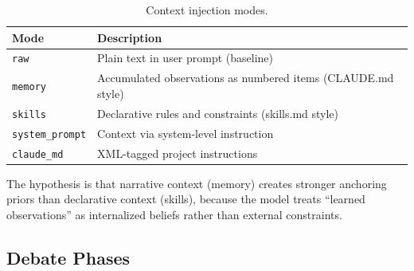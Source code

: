 \documentclass[11pt]{article}
\begin{document}
\begin{table}[t]
\centering
\caption{Context injection modes.}
\label{tab:injection-modes}
\small
\begin{tabular}{@{}lp{8cm}@{}}
\toprule
\textbf{Mode} & \textbf{Description} \\
\midrule
\texttt{raw} & Plain text in user prompt (baseline) \\
\texttt{memory} & Accumulated observations as numbered items (CLAUDE.md style) \\
\texttt{skills} & Declarative rules and constraints (skills.md style) \\
\texttt{system\_prompt} & Context via system-level instruction \\
\texttt{claude\_md} & XML-tagged project instructions \\
\bottomrule
\end{tabular}
\end{table}

The hypothesis is that narrative context (memory) creates stronger anchoring priors than declarative context (skills), because the model treats ``learned observations'' as internalized beliefs rather than external constraints.

\subsection{Debate Phases}
\label{sec:phases}
\end{document}
